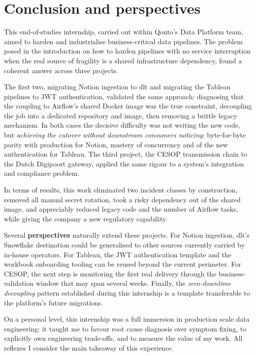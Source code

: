 \chapter*{Conclusion and perspectives}

This end-of-studies internship, carried out within Qonto's Data Platform team, aimed to harden and industrialise business-critical data pipelines. The problem posed in the introduction on how to harden pipelines with no service interruption when the real source of fragility is a shared infrastructure dependency, found a coherent answer across three projects.

The first two, migrating Notion ingestion to dlt and migrating the Tableau pipelines to JWT authentication, validated the same approach: diagnosing that the coupling to Airflow's shared Docker image was the true constraint, decoupling the job into a dedicated repository and image, then removing a brittle legacy mechanism. In both cases the decisive difficulty was not writing the new code, but \emph{achieving the cutover without downstream consumers noticing}: byte-for-byte parity with production for Notion, mastery of concurrency and of the new authentication for Tableau. The third project, the CESOP transmission chain to the Dutch Digipoort gateway, applied the same rigour to a system's integration and compliance problem.

In terms of results, this work eliminated two incident classes by construction, removed all manual secret rotation, took a risky dependency out of the shared image, and appreciably reduced legacy code and the number of Airflow tasks, while giving the company a new regulatory capability.

Several \textbf{perspectives} naturally extend these projects. For Notion ingestion, dlt's Snowflake destination could be generalised to other sources currently carried by in-house operators. For Tableau, the JWT authentication template and the workbook onboarding tooling can be reused beyond the current perimeter. For CESOP, the next step is monitoring the first real delivery through the business-validation window that may span several weeks. Finally, the \emph{zero-downtime decoupling} pattern established during this internship is a template transferable to the platform's future migrations.

On a personal level, this internship was a full immersion in production scale data engineering: it taught me to favour root cause diagnosis over symptom fixing, to explicitly own engineering trade-offs, and to measure the value of my work. All reflexes I consider the main takeaway of this experience.
